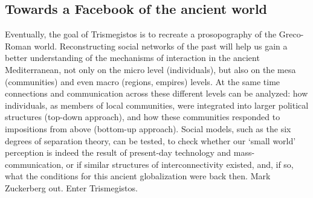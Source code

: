 \documentclass[amsthm,ebook]{saparticle}
\begin{document}
\subsection{Towards a Facebook of the ancient world}


Eventually, the goal of Trismegistos is to recreate a prosopography of the Greco-Roman world. Reconstructing social
networks of the past will help us gain a better understanding of the mechanisms of interaction in the ancient
Mediterranean, not only on the micro level (individuals), but also on the mesa (communities) and even macro (regions,
empires) levels. At the same time connections and communication across these different levels can be analyzed: how
individuals, as members of local communities, were integrated into larger political structures (top-down approach), and
how these communities responded to impositions from above (bottom-up approach). Social models, such as the six degrees
of separation theory, can be tested, to check whether our `small world' perception is indeed the result of present-day
technology and mass-communication, or if similar structures of interconnectivity existed, and, if so, what the
conditions for this ancient globalization were back then. Mark Zuckerberg out. Enter Trismegistos. 




\end{document}

